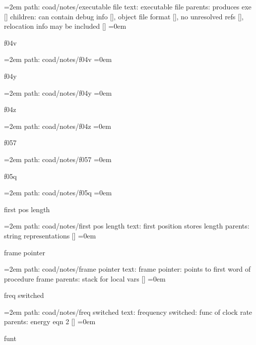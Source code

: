 \par\begingroup
\leftskip=2em
path: coad/notes/executable file
\smallskip
text:  executable file
\smallskip
parents:  produces exe []
\smallskip
children: can contain debug info [], object file format [], no unresolved refs [], relocation info may be included []
\smallskip
\leftskip=0em
\par\endgroup
\bigskip
{}
f04v
\smallskip
\par\begingroup
\leftskip=2em
path: coad/notes/f04v
\smallskip
\leftskip=0em
\par\endgroup
\bigskip
{}
f04y
\smallskip
\par\begingroup
\leftskip=2em
path: coad/notes/f04y
\smallskip
\leftskip=0em
\par\endgroup
\bigskip
{}
f04z
\smallskip
\par\begingroup
\leftskip=2em
path: coad/notes/f04z
\smallskip
\leftskip=0em
\par\endgroup
\bigskip
{}
f057
\smallskip
\par\begingroup
\leftskip=2em
path: coad/notes/f057
\smallskip
\leftskip=0em
\par\endgroup
\bigskip
{}
f05q
\smallskip
\par\begingroup
\leftskip=2em
path: coad/notes/f05q
\smallskip
\leftskip=0em
\par\endgroup
\bigskip
{}
first pos length
\smallskip
\par\begingroup
\leftskip=2em
path: coad/notes/first pos length
\smallskip
text:  first position stores length
\smallskip
parents:  string representations []
\smallskip
\leftskip=0em
\par\endgroup
\bigskip
{}
frame pointer
\smallskip
\par\begingroup
\leftskip=2em
path: coad/notes/frame pointer
\smallskip
text:  frame pointer: points to first word of procedure frame
\smallskip
parents:  stack for local vars []
\smallskip
\leftskip=0em
\par\endgroup
\bigskip
{}
freq switched
\smallskip
\par\begingroup
\leftskip=2em
path: coad/notes/freq switched
\smallskip
text:  frequency switched: func of clock rate
\smallskip
parents:  energy eqn 2 []
\smallskip
\leftskip=0em
\par\endgroup
\bigskip
{}
funt
\smallskip
\par\begingroup
